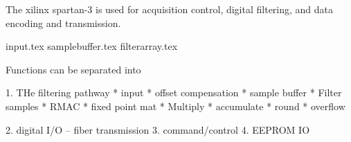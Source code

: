The xilinx spartan-3 is used for acquisition control, digital filtering, and data encoding and transmission. 

{input.tex}
{samplebuffer.tex}
{filterarray.tex}

Functions can be separated into

1. THe filtering pathway
  * input
  * offset compensation
  * sample buffer
  * Filter samples
  * RMAC
     * fixed point mat
     * Multiply
     * accumulate
     * round 
     * overflow
  
2. digital I/O -- fiber transmission
3. command/control
4. EEPROM IO
